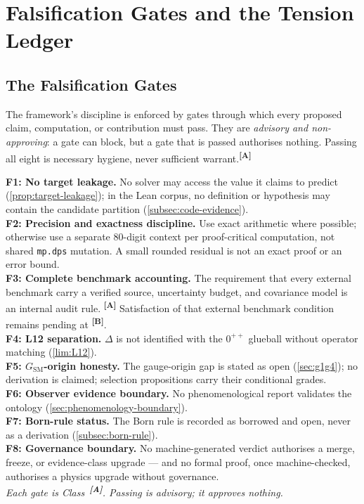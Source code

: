 \documentclass[12pt,a4paper,twoside]{article}
\theoremstyle{plain}
\theoremstyle{definition}
\theoremstyle{remark}
\newcommand{\catmark}[1]{\textsuperscript{\textsf{\textbf{[#1]}}}}
\begin{document}
\section{Falsification Gates and the Tension Ledger}
\label{sec:falsification-tension}

\subsection{The Falsification Gates}
\label{subsec:falsification-gates}

The framework's discipline is enforced by gates through which every
proposed claim, computation, or contribution must pass. They are
\emph{advisory and non-approving}: a gate can block, but a gate that is
passed authorises nothing. Passing all eight is necessary hygiene, never
sufficient warrant.\catmark{A}

\begin{governancebox}
\textbf{F1: No target leakage.} No solver may access the value it claims
to predict (\cref{prop:target-leakage}); in the Lean corpus, no
definition or hypothesis may contain the candidate partition
(\cref{subsec:code-evidence}).\\[0.3em]
\textbf{F2: Precision and exactness discipline.} Use exact arithmetic
where possible; otherwise use a separate 80-digit context per proof-critical
computation, not shared \texttt{mp.dps} mutation. A small rounded residual
is not an exact proof or an error bound.\\[0.3em]
\textbf{F3: Complete benchmark accounting.} The requirement that every
external benchmark carry a verified source, uncertainty budget, and
covariance model is an internal audit rule. \catmark{A} Satisfaction of
that external benchmark condition remains pending at \catmark{B}.\\[0.3em]
\textbf{F4: L12 separation.} $\Delta$ is not identified with the
$0^{++}$ glueball without operator matching (\cref{lim:L12}).\\[0.3em]
\textbf{F5: $G_{\mathrm{SM}}$-origin honesty.} The gauge-origin gap is
stated as open (\cref{sec:g1g4}); no derivation is claimed; selection
propositions carry their conditional grades.\\[0.3em]
\textbf{F6: Observer evidence boundary.} No phenomenological report
validates the ontology (\cref{sec:phenomenology-boundary}).\\[0.3em]
\textbf{F7: Born-rule status.} The Born rule is recorded as borrowed and
open, never as a derivation (\cref{subsec:born-rule}).\\[0.3em]
\textbf{F8: Governance boundary.} No machine-generated verdict
authorises a merge, freeze, or evidence-class upgrade --- and no formal
proof, once machine-checked, authorises a physics upgrade without
governance.\\[0.3em]
\emph{Each gate is Class~\catmark{A}. Passing is advisory; it approves
nothing.}
\end{governancebox}
\end{document}
